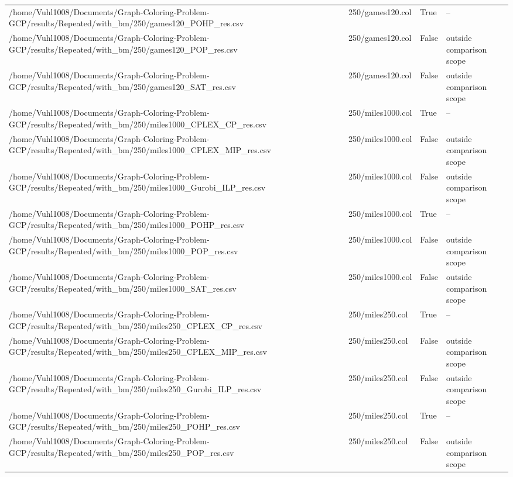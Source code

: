 \begin{table}[htbp]
\begin{tabular}{llll}
/home/Vuhl1008/Documents/Graph-Coloring-Problem-GCP/results/Repeated/with\_bm/250/games120\_POHP\_res.csv & 250/games120.col & True & -- \\
/home/Vuhl1008/Documents/Graph-Coloring-Problem-GCP/results/Repeated/with\_bm/250/games120\_POP\_res.csv & 250/games120.col & False & outside comparison scope \\
/home/Vuhl1008/Documents/Graph-Coloring-Problem-GCP/results/Repeated/with\_bm/250/games120\_SAT\_res.csv & 250/games120.col & False & outside comparison scope \\
/home/Vuhl1008/Documents/Graph-Coloring-Problem-GCP/results/Repeated/with\_bm/250/miles1000\_CPLEX\_CP\_res.csv & 250/miles1000.col & True & -- \\
/home/Vuhl1008/Documents/Graph-Coloring-Problem-GCP/results/Repeated/with\_bm/250/miles1000\_CPLEX\_MIP\_res.csv & 250/miles1000.col & False & outside comparison scope \\
/home/Vuhl1008/Documents/Graph-Coloring-Problem-GCP/results/Repeated/with\_bm/250/miles1000\_Gurobi\_ILP\_res.csv & 250/miles1000.col & False & outside comparison scope \\
/home/Vuhl1008/Documents/Graph-Coloring-Problem-GCP/results/Repeated/with\_bm/250/miles1000\_POHP\_res.csv & 250/miles1000.col & True & -- \\
/home/Vuhl1008/Documents/Graph-Coloring-Problem-GCP/results/Repeated/with\_bm/250/miles1000\_POP\_res.csv & 250/miles1000.col & False & outside comparison scope \\
/home/Vuhl1008/Documents/Graph-Coloring-Problem-GCP/results/Repeated/with\_bm/250/miles1000\_SAT\_res.csv & 250/miles1000.col & False & outside comparison scope \\
/home/Vuhl1008/Documents/Graph-Coloring-Problem-GCP/results/Repeated/with\_bm/250/miles250\_CPLEX\_CP\_res.csv & 250/miles250.col & True & -- \\
/home/Vuhl1008/Documents/Graph-Coloring-Problem-GCP/results/Repeated/with\_bm/250/miles250\_CPLEX\_MIP\_res.csv & 250/miles250.col & False & outside comparison scope \\
/home/Vuhl1008/Documents/Graph-Coloring-Problem-GCP/results/Repeated/with\_bm/250/miles250\_Gurobi\_ILP\_res.csv & 250/miles250.col & False & outside comparison scope \\
/home/Vuhl1008/Documents/Graph-Coloring-Problem-GCP/results/Repeated/with\_bm/250/miles250\_POHP\_res.csv & 250/miles250.col & True & -- \\
/home/Vuhl1008/Documents/Graph-Coloring-Problem-GCP/results/Repeated/with\_bm/250/miles250\_POP\_res.csv & 250/miles250.col & False & outside comparison scope \\

\end{tabular}
\end{table}
